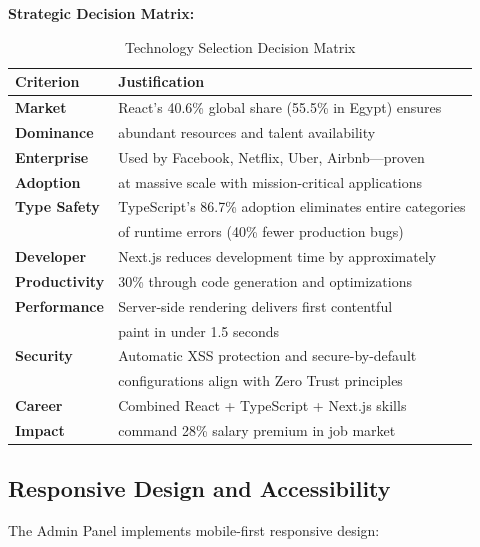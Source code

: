 \begin{mdframed}[backgroundcolor=yellow!10, linecolor=orange!60, linewidth=2pt]
\textbf{Strategic Decision Matrix:}

\begin{table}[H]
\centering
\caption{Technology Selection Decision Matrix}
\footnotesize
\begin{tabular}{|l|l|}
\hline

\textbf{Criterion} & \textbf{Justification} \\
\hline
\textbf{Market} & React's 40.6\% global share (55.5\% in Egypt) ensures \\
\textbf{Dominance} & abundant resources and talent availability \\
\hline
\textbf{Enterprise} & Used by Facebook, Netflix, Uber, Airbnb---proven \\
\textbf{Adoption} & at massive scale with mission-critical applications \\
\hline
\textbf{Type Safety} & TypeScript's 86.7\% adoption eliminates entire categories \\
 & of runtime errors (40\% fewer production bugs) \\
\hline
\textbf{Developer} & Next.js reduces development time by approximately \\
\textbf{Productivity} & 30\% through code generation and optimizations \\
\hline
\textbf{Performance} & Server-side rendering delivers first contentful \\
 & paint in under 1.5 seconds \\
\hline
\textbf{Security} & Automatic XSS protection and secure-by-default \\
 & configurations align with Zero Trust principles \\
\hline
\textbf{Career} & Combined React + TypeScript + Next.js skills \\
\textbf{Impact} & command 28\% salary premium in job market \\
\hline
\end{tabular}
\end{table}
\end{mdframed}

\subsection{Responsive Design and Accessibility}

The Admin Panel implements mobile-first responsive design:

